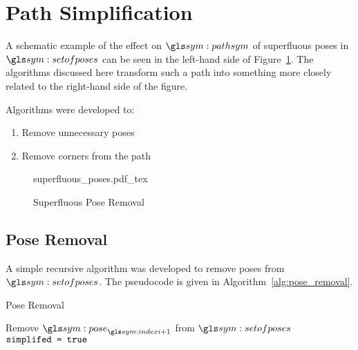 \section{Path Simplification}%
\label{sec:path_simplification}

	A schematic example of the effect on $\pathsym$ of superfluous poses in
	$\setofposes$ can be seen in the left-hand side of
	Figure~\ref{fig:superfluous_poses}. The algorithms discussed here
	transform such a path into something more closely related to the
	right-hand side of the figure.

	Algorithms were developed to:

	\begin{enumerate}

		\item

			Remove unnecessary poses

		\item

			Remove corners from the path

	\end{enumerate}

	\begin{figure}[hb]
		\centering
		\def\svgwidth{\columnwidth}
		{superfluous_poses.pdf_tex}
		\caption{Superfluous Pose Removal}%
		\label{fig:superfluous_poses}
	\end{figure}

	\subsection{Pose Removal}%
	\label{sec:pose_removal}

		A simple recursive algorithm was developed to remove poses from
		$\setofposes$. The pseudocode is given in
		Algorithm~\ref{alg:pose_removal}.

		\begin{algorithm}[ht]
			\caption{Pose Removal}
			\label{alg:pose_removal}
			\begin{algorithmic}[1]
					\State{}
					\For{$\indexi \in [0, |\setofposes| -2]$}
						\label{alg:pose_removal:distance_check}
								\State{}Remove $\pose_{\indexi+1}$ from
								$\setofposes$
								\State{}$\texttt{simplifed = true}$
							\EndIf{}
						\EndIf{}
					\EndFor{}
						\State{}
					\EndIf{}
				\EndProcedure{}
			\end{algorithmic}
		\end{algorithm}

